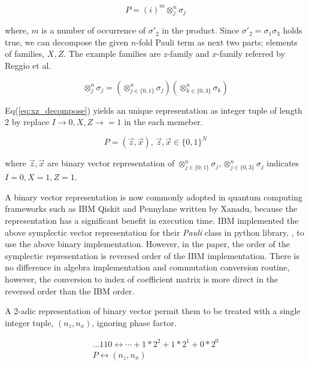 \documentclass[twocolumn]{article}
\begin{document}
\begin{equation}
    P = (i)^m \otimes_j^n \sigma_j
\end{equation}

where, $m$ is a number of occurrence of $\sigma'_2$ in the product.
Since $\sigma'_2 = \sigma_1 \sigma_3$ holds true, we can decompose the given $n$-fold Pauli term as next two
parts; elements of families, $X, Z$. 
The example families are $z$-family and $x$-family referred by Reggio et al\cite{reggio_fast_2023}.

\begin{equation}
    \label{eq:xz_decompose}
    \otimes_j^n \sigma_j = \left( \otimes_{j \in \{0, 1\}}^n \sigma_j \right) \left( \otimes_{k \in \{0, 3\}}^n \sigma_k \right)
\end{equation}

Eq(\ref{eq:xz_decompose}) yields an unique representation as integer tuple of length 2 by 
replace $I \rightarrow 0, X, Z \rightarrow =1$ in the each memeber.

\begin{equation}
    P = (\vec{z}, \vec{x}), \, \vec{z}, \vec{x} \in \{0, 1\}^N
\end{equation}

where $\vec{z}, \vec{x}$ are binary vector representation of $\otimes_{j \in \{0, 1\}}^n \sigma_j, \otimes_{j \in \{0, 3\}}^n \sigma_j$ indicates $I=0, X=1, Z=1$.

A binary vector representation is now commonly adopted in quantum computing frameworks 
such as IBM Qiskit and Pennylane written by Xanadu, 
because the representation has a significant benefit in execution time.
IBM implemented the above symplectic vector representation 
for their \textit{Pauli} class in python library, ,
to use the above binary implementation\cite{Qiskit}. 
However, in the paper, the order of the symplectic representation 
is reversed order of the IBM implementation. 
There is no difference in algebra implementation and 
commutation conversion routine, however, the conversion to index of coefficient
matrix is more direct in the reversed order than the IBM order.


A 2-adic representation of binary vector permit them to be treated with 
a single integer tuple, $(n_z, n_x)$, ignoring phase factor.

\begin{align}
    \dots110 \leftrightarrow \cdots + 1*2^2+1*2^1+0*2^0\\
    P \leftrightarrow (n_z, n_x)\label{eq:symplectic_nznx}
\end{align}
\end{document}
